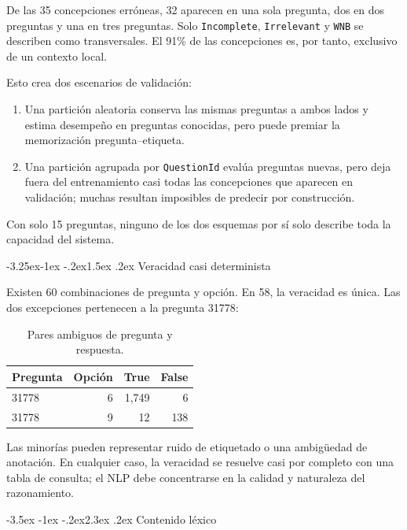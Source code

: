 \documentclass[11pt,oneside,openany]{book}
\makeatletter
\renewcommand\section{\@startsection{section}{1}{\z@}%
  {-3.5ex \@plus -1ex \@minus -.2ex}{2.3ex \@plus .2ex}%
  {\normalfont\Large\sffamily\bfseries\color{AzulMedio}}}
\renewcommand\subsection{\@startsection{subsection}{2}{\z@}%
  {-3.25ex\@plus -1ex \@minus -.2ex}{1.5ex \@plus .2ex}%
  {\normalfont\large\sffamily\bfseries\color{TurquesaOscuro}}}
\newcommand{\codigo}[1]{\texttt{#1}}
\makeatother
\begin{document}
De las 35 concepciones erróneas, 32 aparecen en una sola pregunta, dos en dos
preguntas y una en tres preguntas. Solo \codigo{Incomplete},
\codigo{Irrelevant} y \codigo{WNB} se describen como transversales. El 91\% de
las concepciones es, por tanto, exclusivo de un contexto local.

Esto crea dos escenarios de validación:

\begin{enumerate}
  \item Una partición aleatoria conserva las mismas preguntas a ambos lados y
        estima desempeño en preguntas conocidas, pero puede premiar la
        memorización pregunta--etiqueta.
  \item Una partición agrupada por \codigo{QuestionId} evalúa preguntas nuevas,
        pero deja fuera del entrenamiento casi todas las concepciones que
        aparecen en validación; muchas resultan imposibles de predecir por
        construcción.
\end{enumerate}

Con solo 15 preguntas, ninguno de los dos esquemas por sí solo describe toda la
capacidad del sistema.

\subsection{Veracidad casi determinista}

Existen 60 combinaciones de pregunta y opción. En 58, la veracidad es única.
Las dos excepciones pertenecen a la pregunta 31778:

\begin{table}[htbp]
\centering
\caption{Pares ambiguos de pregunta y respuesta.}
\label{tab:ambiguos}
\begin{tabular}{@{}lrrr@{}}
\toprule
\textbf{Pregunta} & \textbf{Opción} & \textbf{True} & \textbf{False}\\
\midrule
31778 & 6 & 1,749 & 6\\
31778 & 9 & 12 & 138\\
\bottomrule
\end{tabular}
\end{table}

Las minorías pueden representar ruido de etiquetado o una ambigüedad de
anotación. En cualquier caso, la veracidad se resuelve casi por completo con
una tabla de consulta; el NLP debe concentrarse en la calidad y naturaleza del
razonamiento.

\section{Contenido léxico}
\end{document}
